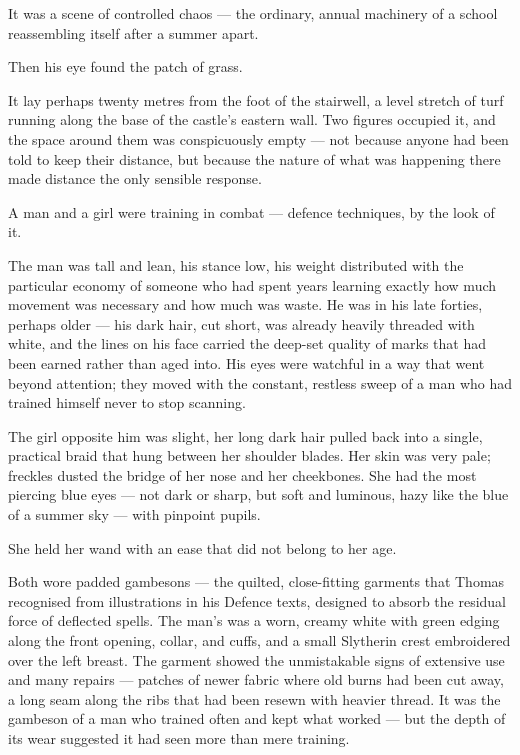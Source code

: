 It was a scene of controlled chaos --- the ordinary, annual machinery of a school reassembling itself after a summer apart.

Then his eye found the patch of grass.

It lay perhaps twenty metres from the foot of the stairwell, a level stretch of turf running along the base of the castle's eastern wall. Two figures occupied it, and the space around them was conspicuously empty --- not because anyone had been told to keep their distance, but because the nature of what was happening there made distance the only sensible response.

A man and a girl were training in combat --- defence techniques, by the look of it.

The man was tall and lean, his stance low, his weight distributed with the particular economy of someone who had spent years learning exactly how much movement was necessary and how much was waste. He was in his late forties, perhaps older --- his dark hair, cut short, was already heavily threaded with white, and the lines on his face carried the deep-set quality of marks that had been earned rather than aged into. His eyes were watchful in a way that went beyond attention; they moved with the constant, restless sweep of a man who had trained himself never to stop scanning.

The girl opposite him was slight, her long dark hair pulled back into a single, practical braid that hung between her shoulder blades. Her skin was very pale; freckles dusted the bridge of her nose and her cheekbones. She had the most piercing blue eyes --- not dark or sharp, but soft and luminous, hazy like the blue of a summer sky --- with pinpoint pupils.

She held her wand with an ease that did not belong to her age.

Both wore padded gambesons --- the quilted, close-fitting garments that Thomas recognised from illustrations in his Defence texts, designed to absorb the residual force of deflected spells. The man's was a worn, creamy white with green edging along the front opening, collar, and cuffs, and a small Slytherin crest embroidered over the left breast. The garment showed the unmistakable signs of extensive use and many repairs --- patches of newer fabric where old burns had been cut away, a long seam along the ribs that had been resewn with heavier thread. It was the gambeson of a man who trained often and kept what worked --- but the depth of its wear suggested it had seen more than mere training.

